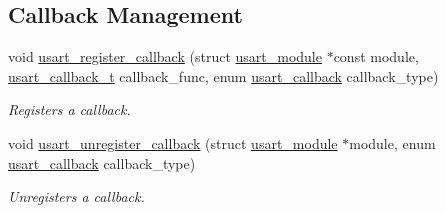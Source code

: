 \subsection*{Callback Management}
\begin{DoxyCompactItemize}
\item 
void \mbox{\hyperlink{group__asfdoc__sam0__sercom__usart__group_ga39e38593fb41abe34cec95d53c7b1e37}{usart\+\_\+register\+\_\+callback}} (struct \mbox{\hyperlink{structusart__module}{usart\+\_\+module}} $\ast$const module, \mbox{\hyperlink{group__asfdoc__sam0__sercom__usart__group_ga1d3e2901d0cf76f20aae271f7122c67d}{usart\+\_\+callback\+\_\+t}} callback\+\_\+func, enum \mbox{\hyperlink{group__asfdoc__sam0__sercom__usart__group_gae257d5c9ac64a6835db020aa2458439d}{usart\+\_\+callback}} callback\+\_\+type)
\begin{DoxyCompactList}\small\item\em Registers a callback. \end{DoxyCompactList}\item 
void \mbox{\hyperlink{group__asfdoc__sam0__sercom__usart__group_ga5be8cd239bf4acd63e341be97a5cd602}{usart\+\_\+unregister\+\_\+callback}} (struct \mbox{\hyperlink{structusart__module}{usart\+\_\+module}} $\ast$module, enum \mbox{\hyperlink{group__asfdoc__sam0__sercom__usart__group_gae257d5c9ac64a6835db020aa2458439d}{usart\+\_\+callback}} callback\+\_\+type)
\begin{DoxyCompactList}\small\item\em Unregisters a callback. \end{DoxyCompactList}\end{DoxyCompactItemize}
